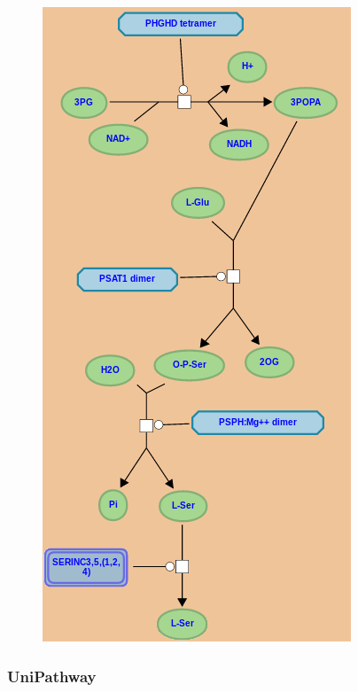 \begin{refsegment}
\begin{shadedfigure}[H]
\begin{subfigure}[b]{\textwidth}
\begin{minipage}[c]{0.38\textwidth}
            \includegraphics[height=0.5\textheight]{img/reactome_homo_sapiens_serine_biosynthesis.png}
        \end{minipage}
        \end{subfigure}
    \end{shadedfigure}

    \subsubsection{UniPathway}
    

\end{refsegment}

